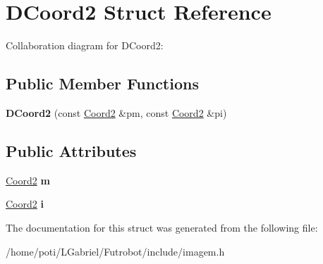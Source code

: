 \hypertarget{structDCoord2}{}\section{D\+Coord2 Struct Reference}
\label{structDCoord2}


Collaboration diagram for D\+Coord2\+:
\subsection*{Public Member Functions}
\begin{DoxyCompactItemize}
\item 
{\bfseries D\+Coord2} (const \hyperlink{structCoord2}{Coord2} \&pm, const \hyperlink{structCoord2}{Coord2} \&pi)\hypertarget{structDCoord2_af28dc7e6fd0d64285118cb224d5432d2}{}\label{structDCoord2_af28dc7e6fd0d64285118cb224d5432d2}

\end{DoxyCompactItemize}
\subsection*{Public Attributes}
\begin{DoxyCompactItemize}
\item 
\hyperlink{structCoord2}{Coord2} {\bfseries m}\hypertarget{structDCoord2_a130f2135db88807c7e8d8421399d4ec8}{}\label{structDCoord2_a130f2135db88807c7e8d8421399d4ec8}

\item 
\hyperlink{structCoord2}{Coord2} {\bfseries i}\hypertarget{structDCoord2_a98284afa2d7e8d465218ee0e56439544}{}\label{structDCoord2_a98284afa2d7e8d465218ee0e56439544}

\end{DoxyCompactItemize}


The documentation for this struct was generated from the following file\+:\begin{DoxyCompactItemize}
\item 
/home/poti/\+L\+Gabriel/\+Futrobot/include/imagem.\+h\end{DoxyCompactItemize}
